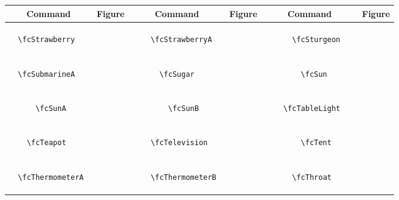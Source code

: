 \documentclass[x11names]{article}
\begin{document}
\begin{table}[H]\centering\begin{tabular}{|c|c|c|c|c|c|}\hline{\bf Command} & {\bf Figure} & {\bf Command} & {\bf Figure} & {\bf Command} & {\bf Figure}\\	\hline	&\multirow{5}{*}{	\fcStrawberry	[scale=0.8]} & &\multirow{5}{*}{	\fcStrawberryA	[scale=0.8]} & &\multirow{5}{*}{	\fcSturgeon	[scale=0.4]}\\	& & & & & \\	& & & & & \\	\verb|	\fcStrawberry	| & & \verb|	\fcStrawberryA	| & & \verb|	\fcSturgeon	| & \\	& & & & & \\	& & & & & \\	& & & & & \\	\hline									
		&\multirow{5}{*}{	\fcSubmarineA	[scale=0.4]} & &\multirow{5}{*}{	\fcSugar	[scale=0.4]} & &\multirow{5}{*}{	\fcSun	[scale=0.8]}\\	& & & & & \\	& & & & & \\	\verb|	\fcSubmarineA	| & & \verb|	\fcSugar	| & & \verb|	\fcSun	| & \\	& & & & & \\	& & & & & \\	& & & & & \\	\hline									
		&\multirow{5}{*}{	\fcSunA	[scale=0.8]} & &\multirow{5}{*}{	\fcSunB	[scale=0.8]} & &\multirow{5}{*}{	\fcTableLight	[scale=0.4]}\\	& & & & & \\	& & & & & \\	\verb|	\fcSunA	| & & \verb|	\fcSunB	| & & \verb|	\fcTableLight	| & \\	& & & & & \\	& & & & & \\	& & & & & \\	\hline									
		&\multirow{5}{*}{	\fcTeapot	[scale=0.4]} & &\multirow{5}{*}{	\fcTelevision	[scale=0.3]} & &\multirow{5}{*}{	\fcTent	[scale=0.4]}\\	& & & & & \\	& & & & & \\	\verb|	\fcTeapot	| & & \verb|	\fcTelevision	| & & \verb|	\fcTent	| & \\	& & & & & \\	& & & & & \\	& & & & & \\	\hline									
		&\multirow{5}{*}{	\fcThermometerA	[scale=0.4]} & &\multirow{5}{*}{	\fcThermometerB	[scale=0.4]} & &\multirow{5}{*}{	\fcThroat	[scale=0.4]}\\	& & & & & \\	& & & & & \\	\verb|	\fcThermometerA	| & & \verb|	\fcThermometerB	| & & \verb|	\fcThroat	| & \\	& & & & & \\	& & & & & \\	& & & & & \\	\hline									

\end{tabular}
\end{table}
\end{document}
